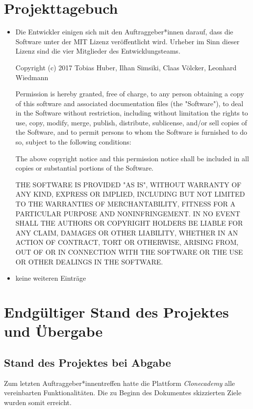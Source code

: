 \documentclass[accentcolor=tud0b,12pt,paper=a4]{tudreport}
\begin{document}
\chapter{Projekttagebuch}
\begin{itemize}
		\item Die Entwickler einigen sich mit den Auftraggeber*innen darauf, dass die Software unter der MIT Lizenz veröffentlicht wird. Urheber im Sinn dieser Lizenz sind die vier Mitglieder des Entwicklungsteams.

	Copyright (c) 2017 Tobias Huber, Ilhan Simsiki, Claas Völcker, Leonhard Wiedmann

	Permission is hereby granted, free of charge, to any person obtaining a copy of this software and associated documentation files (the "Software"), to deal in the Software without restriction, including without limitation the rights to use, copy, modify, merge, publish, distribute, sublicense, and/or sell copies of the Software, and to permit persons to whom the Software is furnished to do so, subject to the following conditions:

	The above copyright notice and this permission notice shall be included in all copies or substantial portions of the Software.

	THE SOFTWARE IS PROVIDED "AS IS", WITHOUT WARRANTY OF ANY KIND, EXPRESS OR IMPLIED, INCLUDING BUT NOT LIMITED TO THE WARRANTIES OF MERCHANTABILITY, FITNESS FOR A PARTICULAR PURPOSE AND NONINFRINGEMENT. IN NO EVENT SHALL THE AUTHORS OR COPYRIGHT HOLDERS BE LIABLE FOR ANY CLAIM, DAMAGES OR OTHER LIABILITY, WHETHER IN AN ACTION OF CONTRACT, TORT OR OTHERWISE, ARISING FROM, OUT OF OR IN CONNECTION WITH THE SOFTWARE OR THE USE OR OTHER DEALINGS IN THE SOFTWARE.
		\item keine weiteren Einträge
\end{itemize}


\chapter{Endgültiger Stand des Projektes und Übergabe}

	\section{Stand des Projektes bei Abgabe}
	Zum letzten Auftraggeber*innentreffen hatte die Plattform \emph{Clonecademy} alle vereinbarten Funktionalitäten. Die zu Beginn des Dokumentes skizzierten Ziele wurden somit erreicht. 
\end{document}
